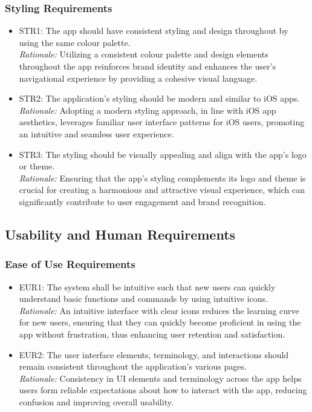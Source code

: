 \documentclass[12pt]{article}
\begin{document}
\subsubsection{Styling Requirements}
\begin{itemize}
\item STR1: The app should have consistent styling and design throughout by using the same colour palette.\\
\textit{Rationale:} Utilizing a consistent colour palette and design elements throughout the app reinforces brand identity and enhances the user's navigational experience by providing a cohesive visual language.
\item STR2: The application’s styling should be modern and similar to iOS apps.\\
\textit{Rationale:} Adopting a modern styling approach, in line with iOS app aesthetics, leverages familiar user interface patterns for iOS users, promoting an intuitive and seamless user experience.
\item STR3: The styling should be visually appealing and align with the app’s logo or theme.\\
\textit{Rationale:} Ensuring that the app's styling complements its logo and theme is crucial for creating a harmonious and attractive visual experience, which can significantly contribute to user engagement and brand recognition.
\end{itemize}

\subsection{Usability and Human Requirements}

\subsubsection{Ease of Use Requirements}
\begin{itemize}
\item EUR1: The system shall be intuitive such that new users can quickly understand basic functions and commands by using intuitive icons.\\
\textit{Rationale:} An intuitive interface with clear icons reduces the learning curve for new users, ensuring that they can quickly become proficient in using the app without frustration, thus enhancing user retention and satisfaction.
\item EUR2: The user interface elements, terminology, and interactions should remain consistent throughout the application’s various pages.\\
\textit{Rationale:} Consistency in UI elements and terminology across the app helps users form reliable expectations about how to interact with the app, reducing confusion and improving overall usability.
\end{itemize}
\end{document}
